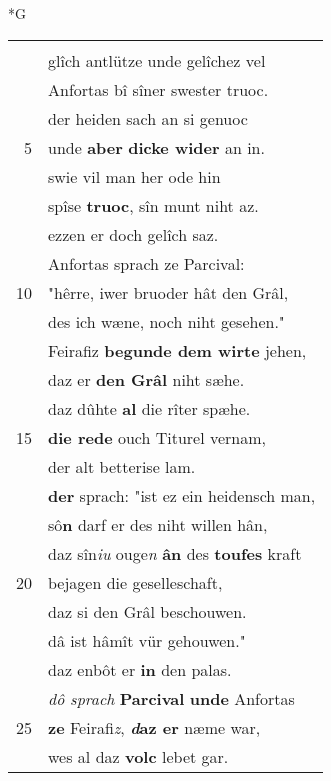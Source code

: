 \documentclass[8pt,a4paper,notitlepage]{article}
\begin{document}
\newpage
\begin{table}[ht]
\begin{minipage}[t]{0.5\linewidth}
\small
\begin{center}*G
\end{center}
\begin{tabular}{rl}
 & \textbf{\begin{large}I\end{large}r} beider vater \textbf{was} Frimutel.\\ 
 & glîch antlütze unde gelîchez vel\\ 
 & Anfortas bî sîner swester truoc.\\ 
 & der heiden sach an si genuoc\\ 
5 & unde \textbf{aber} \textbf{dicke wider} an in.\\ 
 & swie vil man her ode hin\\ 
 & spîse \textbf{truoc}, sîn munt niht az.\\ 
 & ezzen er doch gelîch saz.\\ 
 & Anfortas sprach ze Parcival:\\ 
10 & "hêrre, iwer bruoder hât den Grâl,\\ 
 & des ich wæne, noch niht gesehen."\\ 
 & Feirafiz \textbf{begunde dem wirte} jehen,\\ 
 & daz er \textbf{den Grâl} niht sæhe.\\ 
 & daz dûhte \textbf{al} die rîter spæhe.\\ 
15 & \textbf{die rede} ouch Titurel vernam,\\ 
 & der alt betterise lam.\\ 
 & \textbf{der} sprach: "ist ez ein heidensch man,\\ 
 & sô\textbf{n} darf er des niht willen hân,\\ 
 & daz sîn\textit{iu} ouge\textit{n} \textbf{ân} des \textbf{toufes} kraft\\ 
20 & bejagen die geselleschaft,\\ 
 & daz si den Grâl beschouwen.\\ 
 & dâ ist hâmît vür gehouwen."\\ 
 & daz enbôt er \textbf{in} den palas.\\ 
 & \textit{dô sprach} \textbf{Parcival} \textbf{unde} Anfortas\\ 
25 & \textbf{ze} Feirafi\textit{z}, \textbf{\textit{d}az er} næme war,\\ 
 & wes al daz \textbf{volc} lebet gar.\\ 

\end{tabular}
\end{minipage}
\end{table}
\end{document}
